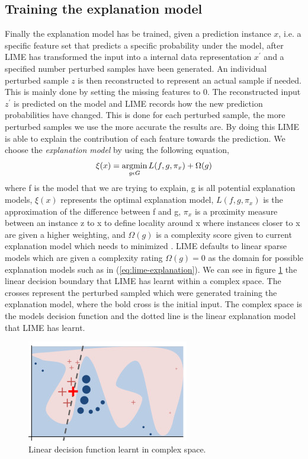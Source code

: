 \subsection{Training the explanation model} Finally the explanation model has be trained, given a prediction instance $x$, i.e. a specific feature set that predicts a specific probability under the model, after LIME has transformed the input into a internal data representation $x^{'}$ and a specified number perturbed samples have been generated. An individual perturbed sample $z$ is then reconstructed to represent an actual sample if needed. This is mainly done by setting the missing features to 0. The reconstructed input $z^{'}$ is predicted on the model and LIME records how the new prediction probabilities have changed. This is done for each perturbed sample, the more perturbed samples we use the more accurate the results are. By doing this LIME is able to explain the contribution of each feature towards the prediction.
We choose the \emph{explanation model} by using the following equation,
\begin{equation}
\xi(x) = \operatorname*{argmin}_{g\epsilon G} L (f, g,\pi_{x} ) + \Omega(g)
\label{eq:explanation-loss}
\end{equation}
where f is the model that we are trying to explain, g is all potential explanation models, $\xi(x)$ represents the optimal explanation model, $L(f, g, \pi_{x})$ is the approximation of the difference between f and g, $\pi_{x}$ is a proximity measure between an instance z to x to define locality around x where instances closer to x are given a higher weighting, and $\Omega(g)$ is a complexity score given to current explanation model which needs to minimized . LIME defaults to linear sparse models which are given a complexity rating $\Omega(g) = 0$  as the domain for possible explanation models such as in (\ref{eq:lime-explanation}).
We can see in figure \ref{fig:lime-boundary} the linear decision boundary that LIME has learnt within a complex space. The crosses represent the perturbed sampled which were generated training the explanation model, where the bold cross is the initial input. The complex space is the models decision function and the dotted line is the linear explanation model that LIME has learnt.

\begin  {figure}[!htpb]
\centering
  \includegraphics[width=0.7\linewidth]{Evaluation_Images/Lime_boundary.jpg}
  \caption{Linear decision function learnt in complex space.}
  \label{fig:lime-boundary}
\end{figure}



